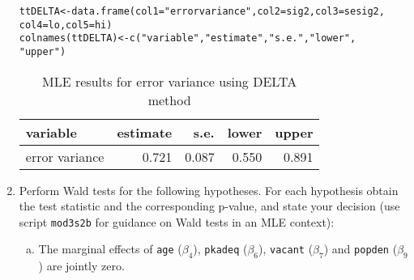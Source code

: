 \documentclass[11pt,reqno]{amsart}\usepackage[]{graphicx}\usepackage[]{color}
\makeatletter
\newcommand{\hlstr}[1]{\textcolor[rgb]{0.063,0.58,0.627}{#1}}%
\newcommand{\hlstd}[1]{\textcolor[rgb]{0.196,0.196,0.196}{#1}}%
\newcommand{\hlkwb}[1]{\textcolor[rgb]{0.627,0,0.314}{#1}}%
\newcommand{\hlkwc}[1]{\textcolor[rgb]{0,0.631,0.314}{#1}}%
\newcommand{\hlkwd}[1]{\textcolor[rgb]{0.78,0.227,0.412}{#1}}%
\newenvironment{kframe}{%
 \def\at@end@of@kframe{}%
 \ifinner\ifhmode%
  \def\at@end@of@kframe{\end{minipage}}%
  \begin{minipage}{\columnwidth}%
 \fi\fi%
 \def\FrameCommand##1{\hskip\@totalleftmargin \hskip-\fboxsep
 \colorbox{shadecolor}{##1}\hskip-\fboxsep
     \hskip-\linewidth \hskip-\@totalleftmargin \hskip\columnwidth}%
 \MakeFramed {\advance\hsize-\width
   \@totalleftmargin\z@ \linewidth\hsize
   \@setminipage}}%
 {\par\unskip\endMakeFramed%
 \at@end@of@kframe}
\newenvironment{knitrout}{}{} %
\newcommand{\ksp}{\vspace{0.1in}}   %
\makeatother
\begin{document}
\begin{enumerate}[(1)]
\begin{knitrout}
\begin{kframe}
\begin{alltt}
\hlstd{ttDELTA} \hlkwb{<-} \hlkwd{data.frame}\hlstd{(}\hlkwc{col1} \hlstd{=} \hlstr{"error variance"}\hlstd{,} \hlkwc{col2} \hlstd{= sig2,} \hlkwc{col3} \hlstd{= sesig2,}
    \hlkwc{col4} \hlstd{= lo,} \hlkwc{col5} \hlstd{= hi)}
\hlkwd{colnames}\hlstd{(ttDELTA)} \hlkwb{<-} \hlkwd{c}\hlstd{(}\hlstr{"variable"}\hlstd{,} \hlstr{"estimate"}\hlstd{,} \hlstr{"s.e."}\hlstd{,} \hlstr{"lower"}\hlstd{,}
    \hlstr{"upper"}\hlstd{)}
\end{alltt}
\end{kframe}
\end{knitrout}
\ksp

\begin{table}[!h]
\centering
\caption{MLE results for error variance using DELTA method} 
\begin{tabular}{lrrrr}
  \hline
variable & estimate & s.e. & lower & upper \\ 
  \hline
error variance & 0.721 & 0.087 & 0.550 & 0.891 \\ 
   \hline
\end{tabular}
\end{table}

\ksp

\item Perform Wald tests for the following hypotheses. For each hypothesis obtain the test statistic and the corresponding p-value, and state your decision (use script \texttt{mod3s2b} for guidance on Wald tests in an MLE context):\\

    \begin{enumerate} [(a)]
    \item The marginal effects of \texttt{age} ($\beta_4$), \texttt{pkadeq} ($\beta_6$), \texttt{vacant} ($\beta_7$) and \texttt{popden} ($\beta_9$) are jointly zero.
    

\end{enumerate}
\end{enumerate}
\end{document}

